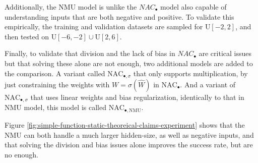 Additionally, the NMU model is unlike the $NAC_{\bullet}$ model also capable of understanding inputs that are both negative and positive. To validate this empirically, the training and validation datasets are sampled for $\mathrm{U}[-2,2]$, and then tested on $\mathrm{U}[-6,-2] \cup \mathrm{U}[2,6]$.

Finally, to validate that division and the lack of bias in $NAC_{\bullet}$ are critical issues but that solving these alone are not enough, two additional models are added to the comparison. A variant called $\mathrm{NAC}_{\bullet, \sigma}$ that only supports multiplication, by just constraining the weights with $W = \sigma(\hat{W})$ in $\mathrm{NAC}_{\bullet}$. And a variant of $\mathrm{NAC}_{\bullet, \sigma}$ that uses linear weights and bias regularization, identically to that in NMU model, this model is called $\mathrm{NAC}_{\bullet, \mathrm{NMU}}$.

Figure \ref{fig:simple-function-static-theoreical-claims-experiment} shows that the NMU can both handle a much larger hidden-size, as well as negative inputs, and that solving the division and bias issues alone improves the success rate, but are no enough.

